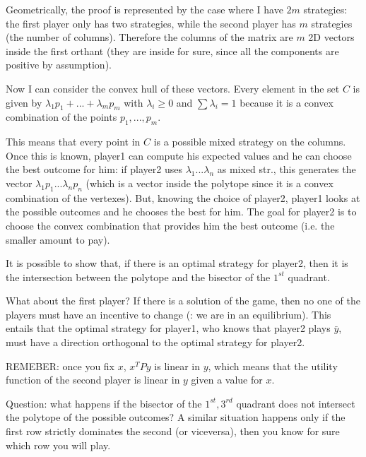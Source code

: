 
\noindent Geometrically, the proof is represented by the case where I have $2m$ 
strategies: the first player only has two strategies, while the second player 
has $m$ strategies (the number of columns). Therefore the columns of the matrix 
are $m$ 2D vectors inside the first orthant (they are inside for sure, since all 
the components are positive by assumption).

\noindent Now I can consider the convex hull of these vectors. Every element in 
the set $C$ is given by $\lambda_1p_1 + ... + \lambda_mp_m$ with $\lambda_i 
\geq 0$ and $\sum{\lambda_i} = 1$ because it is a convex combination of the 
points $p_1,...,p_m$.

\noindent This means that every point in $C$ is a possible mixed strategy on the 
columns. Once this is known, player1 can compute his expected values and he can 
choose the best outcome for him: if player2 uses $\lambda_1...\lambda_n$ as 
mixed str., this generates the vector $\lambda_1p_1...\lambda_np_n$ (which is a 
vector inside the polytope since it is a convex combination of the vertexes).
But, knowing the choice of player2, player1 looks at the possible outcomes 
and he chooses the best for him. The goal for player2 is to choose the convex 
combination that provides him the best outcome (i.e. the smaller amount to pay).

\noindent It is possible to show that, if there is an optimal strategy for 
player2, then it is the intersection between the polytope and the bisector of the 
$1^{st}$ quadrant.

\noindent What about the first player? If there is a solution of the game, then 
no one of the players must have an incentive to change (: we are in an 
equilibrium). This entails that the optimal strategy for player1, who knows that 
player2 plays $\bar{y}$, must have a direction orthogonal to the optimal 
strategy for player2.

\noindent REMEBER: once you fix $x$, $x^TPy$ is linear in $y$, which means that 
the utility function of the second player is linear in $y$ given a 
value for $x$.

\noindent Question: what happens if the bisector of the $1^{st},3^{rd}$ 
quadrant does not intersect the polytope of the possible outcomes?
A similar situation happens only if the first row strictly dominates
the second (or viceversa), then you know for sure which row you will
play.

% 

